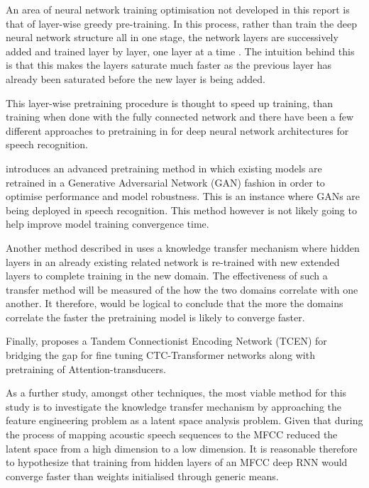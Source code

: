 An area of neural network training optimisation not developed in this report is that of layer-wise greedy pre-training.  In this process, rather than train the deep neural network structure all in one stage, the network layers are successively added and trained layer by layer, one layer at a time \citep{Goodfellow-et-al-2016}.  The intuition behind this is that this makes the layers saturate much faster as the previous layer has already been saturated before the new layer is being added.

This layer-wise pretraining procedure is thought to speed up training, than training when done with the fully connected network and there have been a few different approaches to pretraining in for deep neural network architectures for speech recognition. 

\cite{hendrycks2019using} introduces an advanced pretraining method in which existing models are retrained in a Generative Adversarial Network (GAN) fashion in order to optimise performance and model robustness.  This is an instance where GANs are being deployed in speech recognition.  This method however is not likely going to help improve model training convergence time.

Another method described in \citep{ramachandran2016unsupervised,} uses a knowledge transfer mechanism where hidden layers in an already existing related network is re-trained with new extended layers to complete training in the new domain.  The effectiveness of such a transfer method will be measured of the how the two domains correlate with one another. It therefore, would be logical to conclude that the more the domains correlate the faster the pretraining model is likely to converge faster.

Finally, \cite{wang2019bridging} proposes a Tandem Connectionist Encoding Network (TCEN) for bridging the gap for fine tuning CTC-Transformer networks along with pretraining of Attention-transducers.

As a further study, amongst other techniques, the most viable method for this study is to investigate the knowledge transfer mechanism by approaching the feature engineering problem as a latent space analysis problem.  Given that during the process of mapping acoustic speech sequences to the MFCC reduced the latent space from a high dimension to a low dimension.  It is reasonable therefore to hypothesize that training from hidden layers of an MFCC deep RNN would converge faster than weights initialised through generic means.

